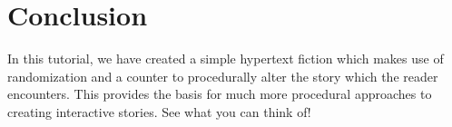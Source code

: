 \documentclass{article}
\begin{document}
\section{Conclusion}

In this tutorial, we have created a simple hypertext fiction which 
makes use of randomization and a counter to procedurally alter the 
story which the reader encounters. This provides the basis for much 
more procedural approaches to creating interactive stories. See what 
you can think of!
\end{document}
